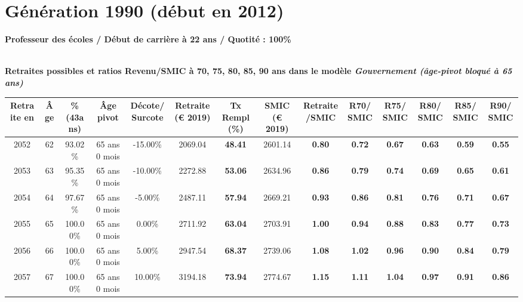 \newpage 
 
\section{Génération 1990 (début en 2012)\label{ProfEcoles_100_1990_22_0}} 
 
{\bf \noindent Professeur des écoles / Début de carrière à 22 ans / Quotité : 100\%}  ~ 

 ~\\{\bf \noindent Retraites possibles et ratios Revenu/SMIC à 70, 75, 80, 85, 90 ans dans le modèle \emph{Gouvernement (âge-pivot bloqué à 65 ans)}}  
 
\begin{adjustbox}{max width=\textwidth} 
\begin{tabular}[htb]{|c|c||c|c|c||c|c||c|c||c|c|c|c|c|} 
\hline 
 Retraite en &  Âge &  \%(43ans) &  Âge pivot &  Décote/Surcote &  Retraite (\euro{} 2019) &  Tx Rempl(\%) &  SMIC (\euro{} 2019) &  Retraite/SMIC &  R70/SMIC &  R75/SMIC &  R80/SMIC &  R85/SMIC &  R90/SMIC \\ 
\hline \hline 
 2052 &  62 &  93.02\% &  65 ans 0 mois &  -15.00\% &  2069.04 &  {\bf 48.41} &  2601.14 &  {\bf {\color{red} 0.80}} &  {\bf {\color{red} 0.72}} &  {\bf {\color{red} 0.67}} &  {\bf {\color{red} 0.63}} &  {\bf {\color{red} 0.59}} &  {\bf {\color{red} 0.55}} \\ 
\hline 
 2053 &  63 &  95.35\% &  65 ans 0 mois &  -10.00\% &  2272.88 &  {\bf 53.06} &  2634.96 &  {\bf {\color{red} 0.86}} &  {\bf {\color{red} 0.79}} &  {\bf {\color{red} 0.74}} &  {\bf {\color{red} 0.69}} &  {\bf {\color{red} 0.65}} &  {\bf {\color{red} 0.61}} \\ 
\hline 
 2054 &  64 &  97.67\% &  65 ans 0 mois &  -5.00\% &  2487.11 &  {\bf 57.94} &  2669.21 &  {\bf {\color{red} 0.93}} &  {\bf {\color{red} 0.86}} &  {\bf {\color{red} 0.81}} &  {\bf {\color{red} 0.76}} &  {\bf {\color{red} 0.71}} &  {\bf {\color{red} 0.67}} \\ 
\hline 
 2055 &  65 &  100.00\% &  65 ans 0 mois &  0.00\% &  2711.92 &  {\bf 63.04} &  2703.91 &  {\bf 1.00} &  {\bf {\color{red} 0.94}} &  {\bf {\color{red} 0.88}} &  {\bf {\color{red} 0.83}} &  {\bf {\color{red} 0.77}} &  {\bf {\color{red} 0.73}} \\ 
\hline 
 2056 &  66 &  100.00\% &  65 ans 0 mois &  5.00\% &  2947.54 &  {\bf 68.37} &  2739.06 &  {\bf 1.08} &  {\bf 1.02} &  {\bf {\color{red} 0.96}} &  {\bf {\color{red} 0.90}} &  {\bf {\color{red} 0.84}} &  {\bf {\color{red} 0.79}} \\ 
\hline 
 2057 &  67 &  100.00\% &  65 ans 0 mois &  10.00\% &  3194.18 &  {\bf 73.94} &  2774.67 &  {\bf 1.15} &  {\bf 1.11} &  {\bf 1.04} &  {\bf {\color{red} 0.97}} &  {\bf {\color{red} 0.91}} &  {\bf {\color{red} 0.86}} \\ 
\hline 
\hline 
\end{tabular} 
\end{adjustbox} 
 
